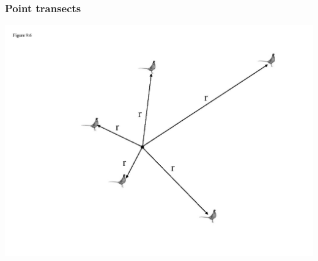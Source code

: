 \documentclass[color=usenames,dvipsnames]{beamer}\usepackage[]{graphicx}\usepackage[]{color}
\begin{document}
\begin{frame}
  \frametitle{Point transects}
  \includegraphics[width=\textwidth]{figs/fig9-8}
\end{frame}














\end{document}

